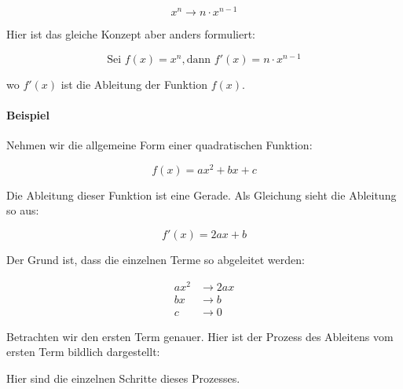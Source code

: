 \documentclass{scrartcl}
\begin{document}
\begin{equation}
    x^n \rightarrow n \cdot x^{n-1}
\end{equation}

Hier ist das gleiche Konzept aber anders formuliert:

\begin{equation}
    \text{Sei } f(x) = x^n, \text{dann } f'(x) = n \cdot x^{n-1}
\end{equation}

wo $f'(x)$ ist die Ableitung der Funktion $f(x)$.

\paragraph{Beispiel} Nehmen wir die allgemeine Form einer quadratischen
Funktion:

\begin{equation}
    f(x) = a x^2 + b x + c
\end{equation}

Die Ableitung dieser Funktion ist eine Gerade.  Als Gleichung sieht die
Ableitung so aus:

\begin{equation}
    f'(x) = 2 a x + b
\end{equation}

Der Grund ist, dass die einzelnen Terme so abgeleitet werden:

\begin{align}
    a x^2 & \rightarrow 2 a x\\
    b x & \rightarrow b\\
    c & \rightarrow 0
\end{align}

Betrachten wir den ersten Term genauer.  Hier ist der Prozess des Ableitens
vom ersten Term bildlich dargestellt:

\begin{center}
\end{center}

Hier sind die einzelnen Schritte dieses Prozesses.
\end{document}
